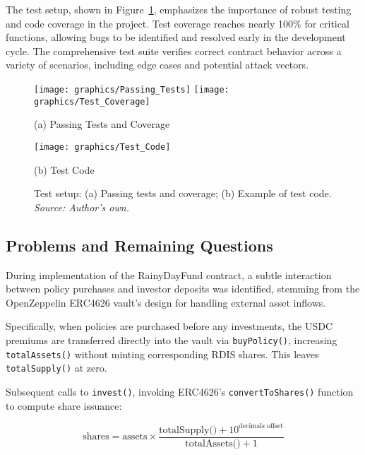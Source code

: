 \documentclass[11pt,a4paper]{article}
\begin{document}
		The test setup, shown in Figure~\ref{fig:test-set-up}, emphasizes the importance of robust testing and code coverage in the project. 
		Test coverage reaches nearly 100\% for critical functions, allowing bugs to be identified and resolved early in the development cycle. 
		The comprehensive test suite verifies correct contract behavior across a variety of scenarios, including edge cases and potential attack vectors. 

		\begin{figure}[!htbp]
			\centering
			\begin{minipage}[b]{0.48\textwidth}
				\centering
				\texttt{[image: graphics/Passing\_Tests]}
				\texttt{[image: graphics/Test\_Coverage]}
				\caption*{(a) Passing Tests and Coverage}
			\end{minipage}\hfill
			\begin{minipage}[b]{0.48\textwidth}
				\centering
				\texttt{[image: graphics/Test\_Code]}
				\caption*{(b) Test Code}
			\end{minipage}
			\caption{Test setup: (a) Passing tests and coverage; (b) Example of test code. \textit{Source: Author's own.}}
			\label{fig:test-set-up}
		\end{figure}

\FloatBarrier

\subsection{Problems and Remaining Questions}\label{subsec:problems-and-remaining-questions}

        During implementation of the RainyDayFund contract, a subtle interaction between policy purchases and investor deposits was identified, stemming from the OpenZeppelin ERC4626 vault's design for handling external asset inflows.

        Specifically, when policies are purchased before any investments, the USDC premiums are transferred directly into the vault via \texttt{buyPolicy()}, increasing \texttt{totalAssets()} without minting corresponding RDIS shares.
        This leaves \texttt{totalSupply()} at zero.

        Subsequent calls to \texttt{invest()}, invoking ERC4626's \texttt{convertToShares()} function to compute share issuance:

        \[
        \text{shares} = \text{assets} \times \frac{\text{totalSupply()} + 10^{\text{decimals offset}}}{\text{totalAssets()} + 1}
        \]
\end{document}
